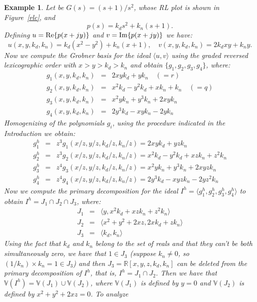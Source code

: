 \documentclass{article}
\newtheorem{example}{Example}[section]
\begin{document}
\begin{example}\label{ex1}\em
Let be $G(s) = (s+1)/s^2$, whose RL plot is shown in Figure~\ref{rlc}, and
\[
p(s) = k_ds^2 + k_n(s+1).
\]
Defining $u={\rm Re}\{p(x+jy)\}$ and $v={\rm Im}\{p(x+jy)\}$ we
have:
\[
u(x,y,k_d,k_n) = k_d (x^2-y^2)+k_n(x+1), \quad
v(x,y,k_d,k_n) = 2k_d xy + k_n y.
\]
Now we compute the Grobner basis for the ideal $\langle u,v \rangle$
using the graded reversed lexicographic order with 
$x>y>k_d>k_n$ and obtain $\{g_1,g_2,g_3,g_4\}$, where:
\begin{eqnarray*}
g_1(x,y,k_d,k_n) & = & 2xyk_d+yk_n \quad (= r) \\
g_2(x,y,k_d,k_n)  & = & x^2k_d-y^2k_d+xk_n+k_n \quad (= q)\\
g_3(x,y,k_d,k_n)  & = & x^2yk_n+y^3k_n+2xyk_n \\
g_4(x,y,k_d,k_n)  & =& 2y^3k_d-xyk_n-2yk_n
\end{eqnarray*}
Homogenizing of the polynomials $g_i$, using the
procedure indicated in the Introduction we obtain:
\begin{eqnarray*}
g_{1}^{h} & = & z^3g_1(x/z,y/z,k_d/z,k_n/z) = 2xyk_d + yzk_n \\
g_{2}^{h} & = & z^3g_2(x/z,y/z,k_d/z,k_n/z) = x^2k_d-y^2k_d+xzk_n+z^2k_n \\
g_{3}^{h} & = & z^4g_3(x/z,y/z,k_d/z,k_n/z) = x^2yk_n + y^3k_n + 2xyzk_n \\
g_{4}^{h} & = & z^4g_4(x/z,y/z,k_d/z,k_n/z) = 2y^3k_d - xyzk_n - 2yz^2k_n 
\end{eqnarray*}
Now we compute the primary decomposition for the ideal 
$I^h=\langle g_{1}^{h}, g_{2}^{h}, g_{3}^{h}, g_{4}^{h}\rangle$ to
obtain $I^h = J_1 \cap J_2 \cap J_3$, where:
\begin{eqnarray}
J_1 & = & \langle y, x^2k_d + xzk_n + z^2k_n \label{j1ex1}\rangle \\
J_2 & = & \langle x^2 + y^2 + 2xz, 2xk_d +zk_n\label{j2ex1}\rangle \\
J_3 & = & \langle k_d, k_n\rangle \label{j3ex1}
\end{eqnarray}
Using the fact that $k_d$ and $k_n$ belong to the set of reals and that they can't be both
simultaneously zero, we have that $1\in J_3$ (suppose $k_n\neq 0$, so $(1/k_n)\times k_n=1\in J_3$)
and then $J_3=\mathbb R[x,y,z,k_d,k_n]$ can be deleted from the primary decomposition of
$I^h$, that is, $I^h=J_1\cap J_2$. Then we have that $\mathbb V(I^h) = \mathbb V(J_1)\cup \mathbb V(J_2)$,
where $\mathbb V(J_1)$ is defined by $y=0$ and $\mathbb V(J_2)$ is defined by $x^2+y^2 + 2xz=0$. To analyze

\end{example}
\end{document}
